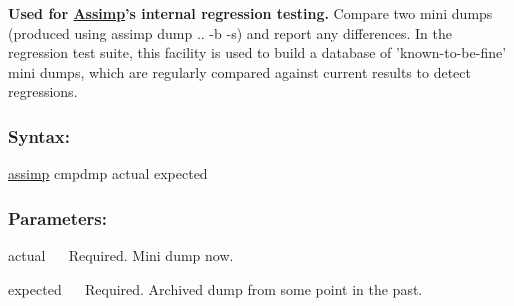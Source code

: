 {\bfseries Used for \hyperlink{class_assimp}{Assimp}'s internal regression testing.} Compare two mini dumps (produced using {\ttfamily assimp dump .. -\/b -\/s}) and report any differences. In the regression test suite, this facility is used to build a database of 'known-\/to-\/be-\/fine' mini dumps, which are regularly compared against current results to detect regressions.

\subsubsection*{Syntax\+:}


\begin{DoxyCode}
\hyperlink{namespaceassimp}{assimp} cmpdmp actual expected
\end{DoxyCode}


\subsubsection*{Parameters\+:}

{\ttfamily  actual~\newline
}~\newline
 Required. Mini dump now. 

{\ttfamily  expected~\newline
}~\newline
 Required. Archived dump from some point in the past. 